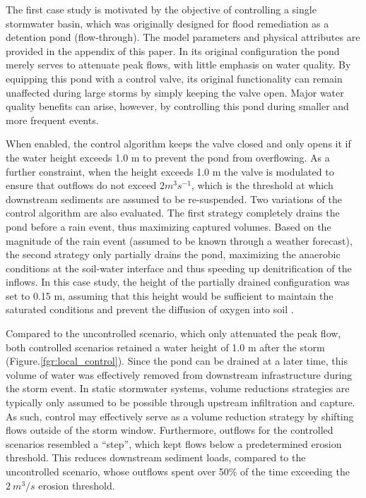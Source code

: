 The first case study is motivated by the objective of controlling a single stormwater basin, which was originally designed for flood remediation as a detention pond (flow-through).  The model parameters and physical attributes are provided in the appendix of this paper. In its original configuration the pond merely serves to attenuate peak flows, with little emphasis on water quality. By equipping this pond with a control valve, its original functionality can remain unaffected during large storms by simply keeping the valve open.  Major water quality benefits can arise, however, by controlling this pond during smaller and more frequent events. 

When enabled, the control algorithm keeps the valve closed and only opens it if the water height exceeds 1.0 m to prevent the pond from overflowing. As a further constraint, when the height exceeds 1.0 m the valve is modulated to ensure that outflows do not exceed $2m^3s^{-1}$, which is the threshold at which downstream sediments are assumed to be re-suspended. Two variations of the control algorithm are also evaluated. The first strategy completely drains the pond before a rain event, thus maximizing captured volumes. Based on the magnitude of the rain event (assumed to be known through a weather forecast), the second strategy only partially drains the pond, maximizing the anaerobic conditions at the soil-water interface and thus speeding up denitrification of the inflows. In this case study, the  height of the partially drained configuration was set to 0.15 m, assuming that this height would be sufficient to maintain the saturated conditions and prevent the diffusion of oxygen into soil \cite{Reddy1989Nitrification-DenitrificationWetlands}. 

Compared to the uncontrolled scenario, which only attenuated the peak flow, both
controlled scenarios retained a water height of 1.0 m after the storm
(Figure.\ref{fgr:local_control}). Since the pond can be drained at a later time,
this volume of water was effectively removed from downstream infrastructure
during the storm event.  In static stormwater systems, volume reductions
strategies are typically only assumed to be possible through upstream
infiltration and capture. As such, control may effectively serve as a volume
reduction strategy by shifting flows outside of the storm window. Furthermore,
outflows for the controlled scenarios resembled a ``step'', which kept flows below a predetermined erosion threshold. This reduces downstream sediment loads, compared to the uncontrolled scenario, whose outflows spent over 50\% of the time exceeding the $2~m^3/s$ erosion threshold. 

